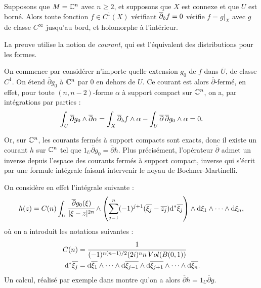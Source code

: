 \begin{prop}
	Supposons que $M=\mathbb{C}^n$ avec $n \geq 2$, et supposons que $X$ est connexe et que $U$ est borné. Alors toute fonction $f \in C^1(X)$ vérifiant $\overline{\partial}_b f =0$ vérifie $f = g|_X$ avec $g$ de classe $C^{\infty}$ jusqu'au bord, et holomorphe à l'intérieur.
\end{prop}
\begin{preuve}
	La preuve utilise la notion de \emph{courant}, qui est l'équivalent des distributions pour les formes.
	
	On commence par considérer n'importe quelle extension $g_0$ de
        $f$ dans $\overline{U}$, de classe $C^1$. On étend
        $\overline{\partial}g_0$ à $\mathbb{C}^n$ par $0$ en dehors de $U$. Ce courant est alors $\overline{\partial}$-fermé, en effet, pour toute $(n,n-2)$-forme $\alpha$ à support compact sur $\mathbb{C}^n$, on a, par intégrations par parties :
	\begin{equation*}
		\int_U\overline{\partial}g_0 \wedge \overline{\partial}\alpha = \int_X\overline{\partial}_b f \wedge \alpha - \int_U\overline{\partial}\,\overline{\partial}g_0 \wedge \alpha = 0.
	\end{equation*}
	
	Or, sur $\mathbb{C}^n$, les courants fermés à support compacts sont exacts, donc il existe un courant $h$ sur $\mathbb{C}^n$ tel que $1_U\overline{\partial}g_0 = \overline{\partial}h$. Plus précisément, l'opérateur $\overline{\partial}$ admet un inverse depuis l'espace des courants fermés à support compact, inverse qui s'écrit par une formule intégrale faisant intervenir le noyau de Bochner-Martinelli.
	
	On considère en effet l'intégrale suivante :
	\begin{equation*}
		h(z) = C(n)\int_U\cfrac{\overline{\partial}g_0(\xi)}{|\xi-z|^{2n}}\wedge \left(\sum_{j=1}^n(-1)^{j+1}(\overline{\xi_j}-\overline{z_j}) \mathrm{d}^* \overline{\xi_j}\right)\wedge \mathrm{d}\xi_1 \wedge \cdots \wedge \mathrm{d} \xi_n,
	\end{equation*}
	où on a introduit les notations suivantes :
	\begin{align*}
		C(n) &= \cfrac{1}{(-1)^{n(n-1)/2}(2i)^nn\,Vol(B(0,1))}\\
		\mathrm{d}^* \overline{\xi_j} &= \mathrm{d} \overline{\xi_1}\wedge \cdots \wedge \mathrm{d} \overline{\xi_{j-1}} \wedge \mathrm{d} \overline{\xi_{j+1}} \wedge \cdots \wedge \mathrm{d} \overline{\xi_{n}}.
	\end{align*}
	Un calcul, réalisé par exemple dans \cite{krantz2013geometric} montre qu'on a alors $\overline{\partial}h = 1_U\overline{\partial}g$.
	

\end{preuve}
